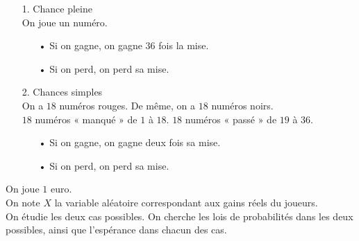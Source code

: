 \begin{itemize}
\item[1.] Chance pleine \\

On joue un numéro. \\

\begin{itemize}
\item[•] Si on gagne, on gagne $36$ fois la mise. 
\item[•] Si on perd, on perd sa mise. 
\end{itemize}

\vspace*{.3cm}

\item[2.] Chances simples \\

On a $18$ numéros rouges. De même, on a $18$ numéros noirs. \\
$18$ numéros « manqué » de $1$ à $18$. $18$ numéros « passé » de $19$ à $36$. \\

\begin{itemize}
\item[•] Si on gagne, on gagne deux fois sa mise. 
\item[•] Si on perd, on perd sa mise. 
\end{itemize}

\end{itemize}

\vspace*{.3cm}

On joue $1$ euro. \\
On note $X$ la variable aléatoire correspondant aux gains réels du joueurs. \\

On étudie les deux cas possibles. On cherche les lois de probabilités dans les deux possibles, ainsi que l'espérance dans chacun des cas. \\

